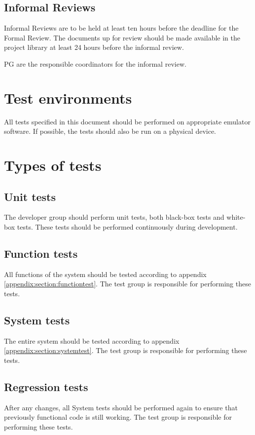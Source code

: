 \documentclass[a4paper]{article}
\begin{document}
\subsection{Informal Reviews}
Informal Reviews are to be held at least ten hours before the deadline for the Formal Review. The documents up for review should be made available in the project library at least 24 hours before the informal review.

PG are the responsible coordinators for the informal review.

\section{Test environments}
All tests specified in this document should be performed on appropriate emulator software. If possible, the tests should also be run on a physical device.

\section{Types of tests}

\subsection{Unit tests}
The developer group should perform unit tests, both black-box tests and white-box tests. These tests should be performed continuously during development.

\subsection{Function tests}
All functions of the system should be tested according to appendix \ref{appendix:section:functiontest}. The test group is responsible for  performing these tests.

\subsection{System tests}
The entire system should be tested according to appendix \ref{appendix:section:systemtest}. The test group is responsible for performing these tests. 

\subsection{Regression tests}
After any changes, all System tests should be performed again to ensure that previously functional code is still working. The test group is responsible for performing these tests.
\end{document}
